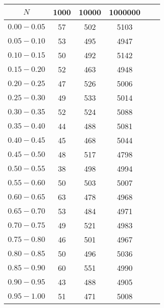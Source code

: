 \documentclass[10pt]{article}
\begin{document}
\begin{enumerate}
\begin{table}[H]
\begin{center}
\begin{tabular}{|c|c|c|c|c|c|}
\hline
$N$ & 1000  & 10000 & 1000000\\
\hline
$0.00-0.05$ & 57 & 502 & 5103\\
\hline
$0.05-0.10$ & 53 & 495 & 4947 \\
\hline
$0.10-0.15$ & 50 & 492 & 5142 \\
\hline
$0.15-0.20$ & 52 & 463 & 4948\\
\hline
$0.20-0.25$ & 47 & 526 & 5006 \\
\hline
$0.25-0.30$ & 49 & 533 & 5014\\
\hline
$0.30-0.35$ & 52 & 524 & 5088\\
\hline
$0.35-0.40$ & 44 & 488 & 5081\\
\hline
$0.40-0.45$ & 45 & 468 & 5044 \\
\hline
$0.45-0.50$ & 48 & 517 & 4798\\
\hline
$0.50-0.55$ & 38 & 498 & 4994\\
\hline
$0.55-0.60$ & 50 & 503 & 5007 \\
\hline
$0.60-0.65$ & 63 & 478 & 4968 \\
\hline
$0.65-0.70$ & 53 & 484 & 4971\\
\hline
$0.70-0.75$ & 49 & 521 & 4983 \\
\hline
$0.75-0.80$ & 46 & 501 & 4967 \\
\hline
$0.80-0.85$ & 50 & 496 & 5036\\
\hline
$0.85-0.90$ & 60 & 551 & 4990 \\
\hline
$0.90-0.95$ & 43 & 488 & 4905 \\
\hline
$0.95-1.00$ & 51 & 471  & 5008 \\
\hline
\end{tabular}
\end{center}
\caption{}
\label{tab:q2_seq1}
\end{table}
\medskip
\end{enumerate}
\end{document}
